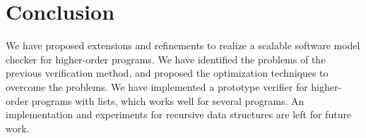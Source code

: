 \section{Conclusion}
\label{sec:conclusion}

We have proposed extensions and refinements to realize a scalable
software model checker for higher-order programs.  We
have identified the problems of the previous verification method, and proposed
the optimization techniques to overcome the problems.  We have
implemented a prototype verifier for higher-order programs with lists,
which works well for several programs.  An implementation and experiments
for recursive data structures are left for future work.


